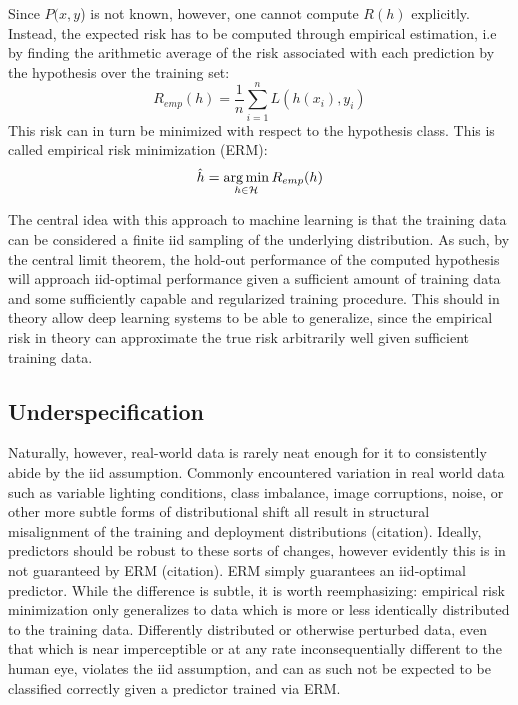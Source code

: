 		Since \(P(x,y\)) is not known, however, one cannot compute \(R(h)\) explicitly. Instead, the expected risk has to be computed through empirical estimation, i.e by finding the arithmetic average of the risk associated with each prediction by the hypothesis over the training set:
		\begin{equation}
		R_{emp}(h) = \frac{1}{n}\sum_{i=1}^{n}L(h(x_i), y_i)
		\end{equation}
		This risk can in turn be minimized with respect to the hypothesis class. This is called empirical risk minimization (ERM):
		\begin{equation}
		\hat{h} = \operatorname*{arg\,min}_{h \in \mathcal{H}}R_{emp}(h)
		\end{equation}
		
		The central idea with this approach to machine learning is that the training data can be considered a finite iid sampling of the underlying distribution. As such, by the central limit theorem, the hold-out performance of the computed hypothesis will approach iid-optimal performance given a sufficient amount of training data and some sufficiently capable and regularized training procedure. This should in theory allow deep learning systems to be able to generalize, since the empirical risk in theory can approximate the true risk arbitrarily well given sufficient training data.
		
		\subsection{Underspecification}	
		
			
		Naturally, however, real-world data is rarely neat enough for it to consistently abide by the iid assumption. Commonly encountered variation in real world data such as variable lighting conditions, class imbalance, image corruptions, noise, or other more subtle forms of distributional shift all result in structural misalignment of the training and deployment distributions (citation). Ideally, predictors should be robust to these sorts of changes, however evidently this is in not guaranteed by ERM (citation). ERM simply guarantees an iid-optimal predictor. While the difference is subtle, it is worth reemphasizing: empirical risk minimization only generalizes to data which is more or less identically distributed to the training data. Differently distributed or otherwise perturbed data, even that which is near imperceptible or at any rate inconsequentially different to the human eye, violates the iid assumption, and can as such not be expected to be classified correctly given a predictor trained via ERM. 
		

